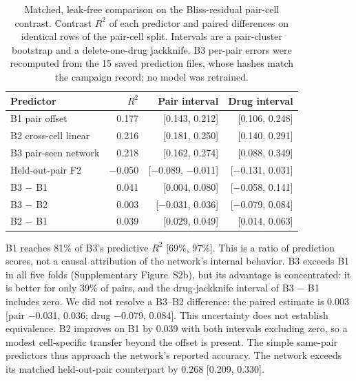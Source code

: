 \documentclass[11pt]{article}
\begin{document}
\begin{table}[htbp]
\caption{Matched, leak-free comparison on the Bliss-residual pair-cell contrast. Contrast $R^2$ of each predictor and paired differences on identical rows of the pair-cell split. Intervals are a pair-cluster bootstrap and a delete-one-drug jackknife. B3 per-pair errors were recomputed from the 15 saved prediction files, whose hashes match the campaign record; no model was retrained.}\label{tab:matched}
\centering\small
\begin{tabular*}{0.86\linewidth}{@{\extracolsep{\fill}}l r r r@{}}
\toprule
Predictor & $R^2$ & Pair interval & Drug interval \\
\midrule
B1 pair offset & 0.177 & [0.143, 0.212] & [0.106, 0.248] \\
B2 cross-cell linear & 0.216 & [0.181, 0.250] & [0.140, 0.291] \\
B3 pair-seen network & 0.218 & [0.162, 0.274] & [0.088, 0.349] \\
Held-out-pair F2 & −0.050 & [−0.089, −0.011] & [−0.131, 0.031] \\
\addlinespace
B3 − B1 & 0.041 & [0.004, 0.080] & [−0.058, 0.141] \\
B3 − B2 & 0.003 & [−0.031, 0.036] & [−0.079, 0.084] \\
B2 − B1 & 0.039 & [0.029, 0.049] & [0.014, 0.063] \\
\bottomrule
\end{tabular*}
\end{table}

B1 reaches 81\% of B3's predictive $R^2$ [69\%, 97\%]. This is a ratio of prediction scores, not a causal attribution of the network's internal behavior. B3 exceeds B1 in all five folds (Supplementary Figure~S2b), but its advantage is concentrated: it is better for only 39\% of pairs, and the drug-jackknife interval of B3 − B1 includes zero. We did not resolve a B3–B2 difference: the paired estimate is 0.003 [pair −0.031, 0.036; drug −0.079, 0.084]. This uncertainty does not establish equivalence. B2 improves on B1 by 0.039 with both intervals excluding zero, so a modest cell-specific transfer beyond the offset is present. The simple same-pair predictors thus approach the network's reported accuracy. The network exceeds its matched held-out-pair counterpart by 0.268 [0.209, 0.330].

\end{document}
